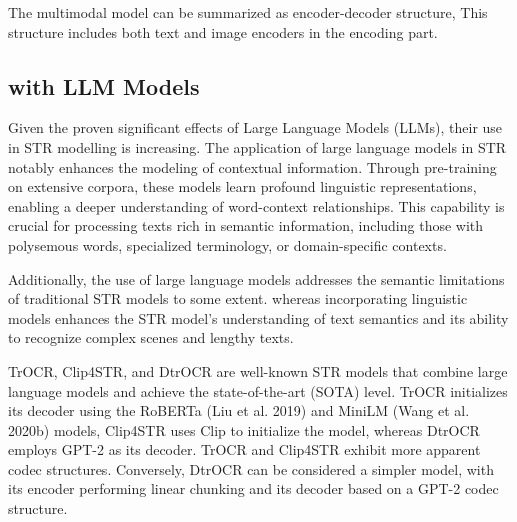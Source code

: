 \documentclass[runningheads]{llncs}
\begin{document}
The multimodal model can be summarized as encoder-decoder structure,	This structure includes both text and image encoders in the encoding part.	
\subsection{with LLM Models} \label{subsec:LLM}
Given the proven significant effects of Large Language Models (LLMs), their use in STR modelling is increasing.	The application of large language models in STR notably enhances the modeling of contextual information.	Through pre-training on extensive corpora, these models learn profound linguistic representations, enabling a deeper understanding of word-context relationships.	This capability is crucial for processing texts rich in semantic information, including those with polysemous words, specialized terminology, or domain-specific contexts.	

Additionally, the use of large language models addresses the semantic limitations of traditional STR models to some extent.	whereas incorporating linguistic models enhances the STR model's understanding of text semantics and its ability to recognize complex scenes and lengthy texts.	

TrOCR, Clip4STR, and DtrOCR are well-known STR models that combine large language models and achieve the state-of-the-art (SOTA) level.	TrOCR initializes its decoder using the RoBERTa (Liu et al. 2019) and MiniLM (Wang et al. 2020b) models,	Clip4STR uses Clip to initialize the model, whereas DtrOCR employs GPT-2 as its decoder.	TrOCR and Clip4STR exhibit more apparent codec structures.	Conversely, DtrOCR can be considered a simpler model, with its encoder performing linear chunking and its decoder based on a GPT-2 codec structure.	
\end{document}
